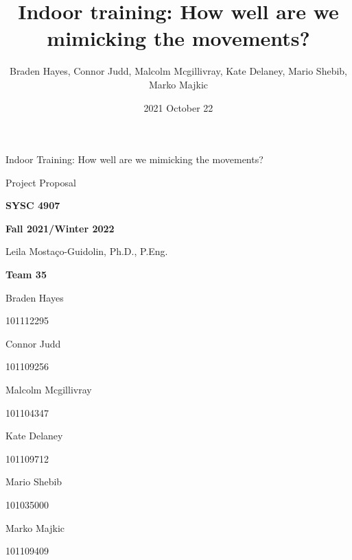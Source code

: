 \documentclass[11pt,letterpaper]{article}
\title{Indoor training: \newline How well are we mimicking the movements? }
\author{Braden Hayes, Connor Judd, Malcolm Mcgillivray, Kate Delaney, Mario Shebib, Marko Majkic}
\date{2021 October 22}
\begin{document}
\frenchspacing

\begin{titlepage}
\centering

{\Huge \sffamily Indoor Training: \newline How well are we mimicking the movements?}


{\Huge \sffamily Project Proposal}

{\large \textbf{SYSC 4907}}

{\large \textbf{Fall 2021/Winter 2022}}

Leila Mostaço-Guidolin, Ph.D., P.Eng.


{\large \textbf{Team 35}}

Braden Hayes

{\footnotesize 101112295}

Connor Judd

{\footnotesize 101109256}

Malcolm Mcgillivray

{\footnotesize 101104347}

Kate Delaney

{\footnotesize 101109712}

Mario Shebib

{\footnotesize 101035000}

Marko Majkic

{\footnotesize 101109409}


\end{titlepage}
\tableofcontents

\end{document}
